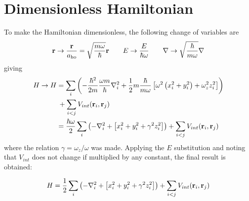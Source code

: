 \section{Dimensionless Hamiltonian}\label{appendix:dimhamiltonian}
To make the Hamiltonian dimensionless, the following change of variables are
\begin{align*}
  \vb{r} \to \frac{\vb{r}}{a_{\text{ho}}} = \sqrt{\frac{m\omega}{\hbar}}\vb{r} \qquad E \to \frac{E}{\hbar\omega}
  \qquad \nabla \to \sqrt{\frac{\hbar}{m\omega}}\nabla
\end{align*}
giving
\begin{align*}
  H \to H &= \sum_{i}\left( -\frac{\hbar^{2}}{2m}\frac{\omega m}{\hbar}\nabla^{2}_{i}
  + \frac{1}{2}m\frac{\hbar}{m\omega}\left[ \omega^{2}\left( x_{i}^{2} + y_{i}^{2}\right) + \omega_{z}^{2}z_{i}^{2} \right] \right)\\
  &\: + \sum_{i<j} V_{int}(\vb{r}_{i}, \vb{r}_{j})\\
  &= \frac{\hbar\omega}{2}\sum_{i}\left(  -\nabla_{i}^{2} + \left[ x_{i}^{2} + y_{i}^{2} + \gamma^{2} z_{i}^{2} \right]\right)
    + \sum_{i<j} V_{int}(\vb{r}_{i}, \vb{r}_{j})\\
\end{align*}
where the relation \(\gamma = \omega_{z}/\omega\) was made. Applying the \(E\)
substitution and noting that \(V_{int}\) does not change if multiplied by any constant, the final result is obtained: 

\begin{align*}
  H &= \frac{1}{2}\sum_{i}\left(  -\nabla_{i}^{2} + \left[ x_{i}^{2} + y_{i}^{2} + \gamma^{2} z_{i}^{2} \right]\right)
    + \sum_{i<j} V_{int}(\vb{r}_{i}, \vb{r}_{j})\\
\end{align*}
